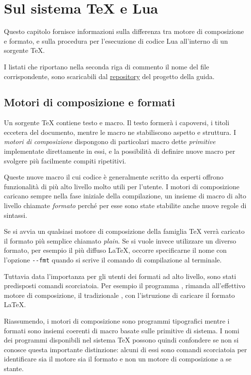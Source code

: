 

\chapter{Sul sistema \TeX{} e Lua}
\label{iichExplain}

Questo capitolo fornisce informazioni sulla differenza tra motore di
composizione e formato, e sulla procedura per l'esecuzione di codice Lua
all'interno di un sorgente \TeX.

I listati che riportano nella seconda riga di commento il nome del file
corrispondente, sono scaricabili dal
\href{https://github.com/GuITeX/guidalua}{repository} del progetto della guida.


\section{Motori di composizione e formati}

Un sorgente \TeX{} contiene testo e macro. Il testo formerà i capoversi, i
titoli eccetera del documento, mentre le macro ne stabiliscono aspetto e
struttura. I \emph{motori di composizione} dispongono di particolari macro dette
\emph{primitive} implementate direttamente in essi, e la possibilità di definire
nuove macro per svolgere più facilmente compiti ripetitivi.

Queste nuove macro il cui codice è generalmente scritto da esperti offrono
funzionalità di più alto livello molto utili per l'utente. I motori di
composizione caricano sempre nella fase iniziale della compilazione, un insieme
di macro di alto livello chiamate \emph{formato} perché per esse sono state
stabilite anche nuove regole di sintassi.

Se si avvia un qualsiasi motore di composizione della famiglia \TeX{} verrà
caricato il formato più semplice chiamato \emph{plain}. Se si vuole invece
utilizzare un diverso formato, per esempio il più diffuso \LaTeX{}, occorre
specificarne il nome con l'opzione \texttt{-{}-fmt} quando si scrive il comando
di compilazione al terminale.

Tuttavia data l'importanza per gli utenti dei formati ad alto livello, sono
stati predisposti comandi scorciatoia. Per esempio il programma
, rimanda all'effettivo motore di composizione, il tradizionale
, con l'istruzione di caricare il formato \LaTeX.

Riassumendo, i motori di composizione sono programmi tipografici mentre i
formati sono insiemi coerenti di macro basate sulle primitive di sistema. I nomi
dei programmi disponibili nel sistema \TeX{} possono quindi confondere se non si
conosce questa importante distinzione: alcuni di essi sono comandi scorciatoia
per identificare sia il motore sia il formato e non un motore di composizione a
se stante.



